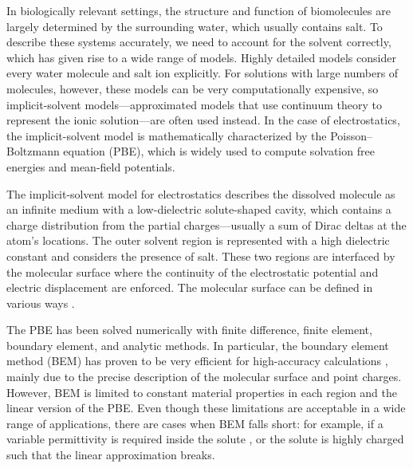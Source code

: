 In biologically relevant settings, the structure and function of biomolecules are largely determined by the surrounding water, which usually contains salt. 
To describe these systems accurately, we need to account for the solvent correctly, which has given rise to a wide range of models.\cite{onufriev2018water}
Highly detailed models consider every water molecule and salt ion explicitly.
For solutions with large numbers of molecules, however, these models can be very computationally expensive, so implicit-solvent models---approximated models that use continuum theory to represent the ionic solution---are often used instead.\cite{RouxSimonson1999,DecherchiETal2015}
In the case of electrostatics, the implicit-solvent model is mathematically characterized by the Poisson--Boltzmann equation (PBE)\cite{Baker2004,Bardhan2012}, which is widely used to compute solvation free energies and mean-field potentials.

The implicit-solvent model for electrostatics describes the dissolved molecule as an infinite medium with a low-dielectric solute-shaped cavity, which contains a charge distribution from the partial charges---usually a sum of Dirac deltas at the atom's locations.
The outer solvent region is represented with a high dielectric constant and considers the presence of salt.
These two regions are interfaced by the molecular surface where the continuity of the electrostatic potential and electric displacement are enforced.
The molecular surface can be defined in various ways \cite{HarrisBoschitcshFenley2013}.


The PBE has been solved numerically with finite difference\cite{BakerETal2001,GilsonETal1985,JurrusETal2018,LiETal2019}, finite element\cite{HolstETal2012,BondEtal2010,nakov2021argos}, boundary element\cite{boschitsch2002fast,LuETal2006,AltmanBardhanWhiteTidor09,bajaj2011efficient,GengKrasny2013,CooperBardhanBarba2014}, and analytic\cite{YapHeadgordon2010,FelbergETal2017} methods.
In particular, the boundary element method (BEM) has proven to be very efficient for high-accuracy calculations \cite{GengKrasny2013,CooperBardhanBarba2014}, mainly due to the precise description of the molecular surface and point charges. 
However, BEM is limited to constant material properties in each region and the linear version of the PBE. 
Even though these limitations are acceptable in a wide range of applications, there are cases when BEM falls short: for example, if a variable permittivity is required inside the solute \cite{grant2001smooth,li2013dielectric}, or the solute is highly charged such that the linear approximation breaks\cite{FogolariETal1999}.

